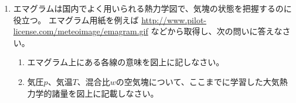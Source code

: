 \documentclass{jsarticle}
\newenvironment{problems}
{
  \renewcommand\labelenumi{\doublebox{\arabic{enumi}}}
  \begin{enumerate}
}{
  \end{enumerate}
  \renewcommand\labelenumi{\arabic{enumi}.}
}
\begin{document}
\begin{problems}
        \begin{enumerate}[(1)]
        \item 文中の空欄(A)〜(J)に当てはまる語句や数値を答えなさい。
        \item 下線部(a)について、気塊の周囲の空気との重さの関係と、気塊が得る加速度の向きを一覧表にまとめなさい。
        \item 下線部(b)について、(E)は(F)より大きいが、そのような大小関係となる理由を説明しなさい。
        \item 下線部(c)について、周囲の気層の気温減率を$\gamma$、気塊の(E)を$\Gamma _d$として、その大小関係と(A),(B),(C)の関係を記しなさい。また、これを温位を用いて書き直しなさい(この部分は導出過程も示しなさい)。
        \item 下線部(d)について、周囲の気層の気温減率を$\gamma$、気塊の(E)を$\Gamma _d$、気塊の(F)を$\Gamma _s$として、その大小関係と以下の気塊の状態のどれが対応するかを一覧に示しなさい。
            \begin{itemize}
            \item 絶対(A)：気塊の飽和状況によらず(A)である状態。
            \item 湿潤(C)：気塊が飽和している場合は(C)であるが、飽和していない場合は(A)である状態。
            \item 条件付き(B)：気塊が飽和している場合は(B)であるが、飽和していない場合は(A)である状態。
            \item 乾燥(C)：気塊が飽和している場合は(B)であるが、飽和していない場合は(C)である状態。
            \item 絶対(B)：気塊の飽和状況によらず(B)である状態。
            \end{itemize}
        \item 下線部(e)について、指数の名称と定義を3例程度挙げなさい。また、その特徴を述べなさい。
        \item 下線部(f)について、気層の相当温位の符号と(J)の状態はどう対応するか記しなさい。\\
        \end{enumerate}

    \item エマグラムは国内でよく用いられる熱力学図で、気塊の状態を把握するのに役立つ。
    エマグラム用紙を例えば \url{http://www.pilot-license.com/meteoimage/emagram.gif} などから取得し、次の問いに答えなさい。
        \begin{enumerate}[(1)]
        \item エマグラム上にある各線の意味を図上に記しなさい。
        \item 気圧$p$、気温$T$、混合比$w$の空気塊について、ここまでに学習した大気熱力学的諸量を図上に記載しなさい。\\
        \end{enumerate}


\end{problems}
\end{document}
